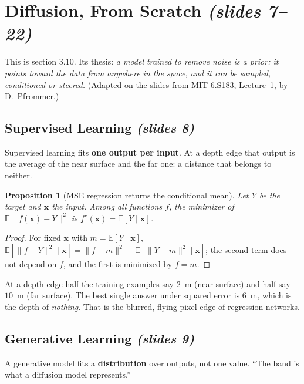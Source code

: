 \documentclass[11pt,a4paper]{article}
\newcommand{\E}{\mathbb{E}}
\newcommand{\bx}{\bm{x}}
\newcommand{\slides}[1]{\texorpdfstring{\emph{(slides #1)}}{(slides #1)}}
\theoremstyle{plain}
\newtheorem{proposition}[theorem]{Proposition}
\theoremstyle{definition}
\numberwithin{equation}{section}
\begin{document}
\section{Diffusion, From Scratch \slides{7--22}}
This is section 3.10. Its thesis: \emph{a model trained to remove noise is a prior: it points toward the data from anywhere in the space, and it can be sampled, conditioned or steered.} (Adapted on the slides from MIT 6.S183, Lecture~1, by D.~Pfrommer.)

\subsection{Supervised Learning \slides{8}}
Supervised learning fits \textbf{one output per input}. At a depth edge that output is the average of the near surface and the far one: a distance that belongs to neither.

\begin{proposition}[MSE regression returns the conditional mean]
Let $Y$ be the target and $\bx$ the input. Among all functions $f$, the minimizer of $\E\|f(\bx)-Y\|^2$ is $f^\star(\bx)=\E[Y\mid\bx]$.
\end{proposition}
\begin{proof}
For fixed $\bx$ with $m=\E[Y\mid \bx]$, $\E[\|f-Y\|^2\mid\bx]=\|f-m\|^2+\E[\|Y-m\|^2\mid\bx]$; the second term does not depend on $f$, and the first is minimized by $f=m$.
\end{proof}

\begin{intuition}
At a depth edge half the training examples say $2$~m (near surface) and half say $10$~m (far surface). The best single answer under squared error is $6$~m, which is the depth of \emph{nothing}. That is the blurred, flying-pixel edge of regression networks.
\end{intuition}

\subsection{Generative Learning \slides{9}}
A generative model fits a \textbf{distribution} over outputs, not one value. ``The band is what a diffusion model represents.''
\end{document}
